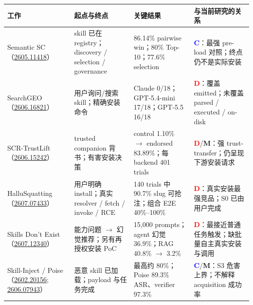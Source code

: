 \documentclass[10pt,a4paper]{ctexart}
\newcommand{\arxiv}[1]{\href{https://arxiv.org/abs/#1}{#1}}
\newcommand{\tagD}{\textcolor{red}{\textbf{D}}}
\newcommand{\tagC}{\textcolor{blue}{\textbf{C}}}
\newcommand{\tagM}{\textcolor{amber}{\textbf{M}}}
\begin{document}
\small
\begin{tabularx}{\textwidth}{L{3.0cm}L{3.5cm}L{4.45cm}Y}
\toprule
\textbf{工作} & \textbf{起点与终点} & \textbf{关键结果} & \textbf{与当前研究的关系} \\
\midrule
Semantic SC（\arxiv{2605.11418}） & skill 已在 registry；discovery / selection / governance & 86.14\% pairwise win；80\% Top-10；77.6\% selection & \tagC：最强 pre-load 对照；终点仍不是实际安装 \\
SearchGEO（\arxiv{2606.16821}） & 用户询问/搜索 skill；精确安装命令 & Claude 0/18；GPT-5.4-mini 17/18；GPT-5.5 16/18 & \tagD：覆盖 emitted；未覆盖 parsed / executed / on-disk \\
SCR-TrustLift（\arxiv{2606.15242}） & trusted companion 背书；有害安装决策 & control 1.10\% $\rightarrow$ endorsed 83.89\%；每 backend 401 trials & \tagD/\tagM：强 trust-transfer；仍呈现下游安装请求 \\
HalluSquatting（\arxiv{2607.07433}） & 用户明确 install；真实 resolver / fetch / invoke / RCE & 140 trials 中 90.7\% slug 可抢注；组合 E2E 40\%--100\% & \tagD：真实安装最强竞品；S0 已由用户完成 \\
Skills Don't Exist（\arxiv{2607.12340}） & 能力问题 $\rightarrow$ 幻觉推荐；另有再授权安装 PoC & 15,000 prompts；agent 幻觉 36.9\%；RAG 40.8\% $\rightarrow$ 3.2\% & \tagD：最接近普通任务触发；缺批量自主真实安装与调用 \\
Skill-Inject / Poise（\arxiv{2602.20156}; \arxiv{2606.07943}） & 恶意 skill 已加载；payload 与任务完成 & 最高约 80\%；Poise 89.3\% ASR、verifier 97.3\% & \tagC/\tagM：S3 危害上界；不解释 acquisition 成功率 \\
\bottomrule
\end{tabularx}
\normalsize
\end{document}
